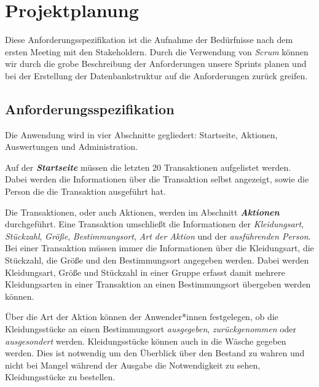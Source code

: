 \section{Projektplanung}\label{sec:Projektplanung}

Diese Anforderungsspezifikation ist die Aufnahme der Bedürfnisse nach dem ersten Meeting mit den Stakeholdern. Durch die Verwendung von \textit{Scrum} können wir durch die grobe Beschreibung der Anforderungen unsere Sprints planen und bei der Erstellung der Datenbankstruktur auf die Anforderungen zurück greifen. 


\subsection{Anforderungsspezifikation}\label{sec:anforderungen}

Die Anwendung wird in vier Abschnitte gegliedert: Startseite, Aktionen, Auswertungen und Administration.

Auf der \textit{\textbf{Startseite}} müssen die letzten 20 Transaktionen aufgelistet werden. Dabei werden die Informationen über die Transaktion selbst angezeigt, sowie die Person die die Transaktion ausgeführt hat.

Die Transaktionen, oder auch Aktionen, werden im Abschnitt \textit{\textbf{Aktionen}} durchgeführt. Eine Transaktion umschließt die Informationen der \textit{Kleidungsart}, \textit{Stückzahl}, \textit{Größe}, \textit{Bestimmungsort}, \textit{Art der Aktion} und der \textit{ausführenden Person}. Bei einer Transaktion müssen immer die Informationen über die Kleidungsart, die Stückzahl, die Größe und den Bestimmungsort angegeben werden. Dabei werden Kleidungsart, Größe und Stückzahl in einer Gruppe erfasst damit mehrere Kleidungsarten in einer Transaktion an einen Bestimmungsort übergeben werden können. 

Über die Art der Aktion können der Anwender*innen festgelegen, ob die Kleidungsstücke an einen Bestimmungsort \textit{ausgegeben}, \textit{zurückgenommen} oder \textit{ausgesondert} werden. Kleidungsstücke können auch in die Wäsche gegeben werden. Dies ist notwendig um den Überblick über den Bestand zu wahren und nicht bei Mangel während der Ausgabe die Notwendigkeit zu sehen, Kleidungsstücke zu bestellen.

